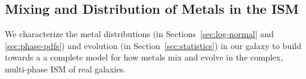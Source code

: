 \documentclass[twocolumn]{aastex61}
\begin{document}
\subsection{Mixing and Distribution of Metals in the ISM}
\label{sec:mixing}


      We characterize the metal distributions (in Sections~\ref{sec:log-normal} and \ref{sec:phase-pdfs}) and evolution (in Section~\ref{sec:statistics}) in our galaxy to build towards a  a complete model for how metals mix and evolve in the complex, multi-phase ISM of real galaxies.

\end{document}
